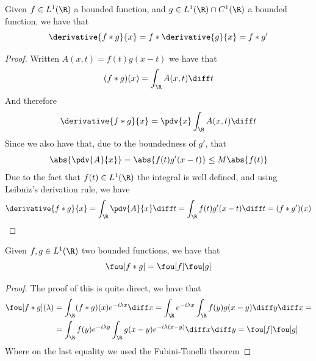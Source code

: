 \documentclass[../mmf.tex]{subfiles}
\begin{document}
\begin{thm}
	Given $f\in L^1(\R)$ a bounded function, and $g\in L^1(\R)\cap C^1(\R)$ a bounded function, we have that
	\begin{equation}
		\derivative{f*g}{x}=f*\derivative{g}{x}=f*g'
		\label{eq:convderiv}
	\end{equation}
\end{thm}
\begin{proof}
	Written $A(x,t)=f(t)g(x-t)$ we have that
	\begin{equation*}
		(f*g)(x)=\int_{\R}^{}A(x,t)\diff t
	\end{equation*}
	And therefore
	\begin{equation*}
		\derivative{f*g}{x}=\pdv{x}\int_{\R}^{}A(x,t)\diff t
	\end{equation*}
	Since we also have that, due to the boundedness of $g'$, that
	\begin{equation*}
		\abs{\pdv{A}{x}}=\abs{f(t)g'(x-t)}\le M\abs{f(t)}
	\end{equation*}
	Due to the fact that $f(t)\in L^1(\R)$ the integral is well defined, and using Leibniz's derivation rule, we have
	\begin{equation*}
		\derivative{f*g}{x}=\int_{\R}\pdv{A}{x}\diff t=\int_{\R}^{}f(t)g'(x-t)\diff t=(f*g')(x)
	\end{equation*}
\end{proof}
\begin{thm}
	Given $f,g\in L^1(\R)$ two bounded functions, we have that
	\begin{equation}
		\fou[f*g]=\fou[f]\fou[g]
		\label{eq:convprodfou}
	\end{equation}
\end{thm}
\begin{proof}
	The proof of this is quite direct, we have that
	\begin{equation*}
		\begin{aligned}
			\fou[f*g](\lambda)&=\int_{\R}^{}(f*g)(x)e^{-i\lambda x}\diff x=\int_{\R}^{}e^{-i\lambda x}\int_{\R}^{}f(y)g(x-y)\diff y\diff x=\\
			&=\int_{\R}^{}f(y)e^{-i\lambda y}\int_{\R}^{}g(x-y)e^{-i\lambda(x-y)}\diff x\diff y=\fou[f]\fou[g]
		\end{aligned}
	\end{equation*}
	Where on the last equality we used the Fubini-Tonelli theorem
\end{proof}
\end{document}
